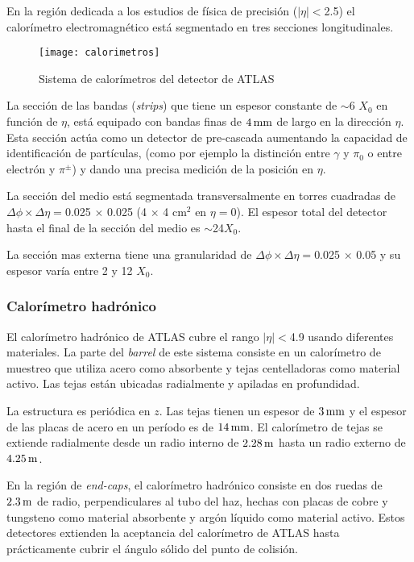 En la región dedicada a los estudios de física de precisión ($|\eta|<$2.5) el
calorímetro electromagnético está segmentado en tres secciones longitudinales.%

\begin{figure}[!htbp]
  \centering

  \texttt{[image: calorimetros]}

  \caption{Sistema de calorímetros del detector de ATLAS}
  \label{fig:calorimetros}

\end{figure}

La sección de las bandas (\emph{strips}) que tiene un espesor constante de
$\sim$6 $X_0$ en función de $\eta$, está equipado con bandas finas de $\unit[4]{mm}$ de
largo en la dirección $\eta$. Esta sección actúa como un detector de pre-cascada
aumentando la capacidad de identificación de partículas,
(como por ejemplo la distinción entre $\gamma$ y $\pi_0$ o entre electrón y
$\pi^\pm$) y dando una precisa medición de la posición en $\eta$.

La sección del medio está segmentada transversalmente en torres cuadradas de
$\Delta \phi \times \Delta \eta=$0.025 $\times$ 0.025 (4 $\times$ 4 cm$^2$ en
$\eta=0$). El espesor total del detector hasta el final de la sección del medio
es $\sim$24$X_0$.

La sección mas externa tiene una granularidad de
$\Delta\phi\times\Delta\eta=$0.025 $\times$ 0.05 y su espesor varía entre 2 y 12
$X_0$.

\subsubsection{Calorímetro hadrónico}

El calorímetro hadrónico de ATLAS \cite{calohadTDR} cubre el rango $|\eta|<$4.9
usando diferentes materiales.
La parte del \emph{barrel} de este sistema consiste en un calorímetro de muestreo que
utiliza acero como absorbente y tejas centelladoras como material activo. Las
tejas están ubicadas radialmente y apiladas en profundidad.

La estructura es periódica en $z$. Las tejas tienen un espesor de $\unit[3]{mm}$ y el
espesor de las placas de acero en un período es de $\unit[14]{mm}$.
El calorímetro de tejas se extiende radialmente desde un radio interno de $\unit[2.28]{m}$
hasta un radio externo de $\unit[4.25]{m}$.

En la región de \emph{end-caps}, el calorímetro hadrónico consiste en dos ruedas de
$\unit[2.3]{m}$ de radio, perpendiculares al tubo del haz, hechas con placas de cobre y
tungsteno como material absorbente y argón líquido como material activo. Estos
detectores extienden la aceptancia del calorímetro de ATLAS hasta prácticamente
cubrir el ángulo sólido del punto de colisión.


